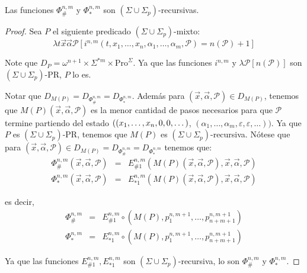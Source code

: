   \begin{theorem}
    \PN Las funciones $\Phi_{\#}^{n,m}$ y $\Phi_{\ast}^{n,m}$ son $(\Sigma \cup \Sigma_{p})$-recursivas.
  \end{theorem}
  \begin{proof}
    \PN Sea $P$ el siguiente predicado $(\Sigma \cup \Sigma_{p})$-mixto:
    \[
      \lambda t\vec{x}\vec{\alpha}\mathcal{P}\left[i^{n,m}(t,x_{1},\dotsc,x_{n},\alpha_{1},\dotsc,\alpha_{m},
      \mathcal{P}) = n(\mathcal{P}) + 1\right]
    \]

    \PN Note que $D_{P} = \omega^{n+1} \times \Sigma^{\ast m} \times \mathrm{Pro}^{\Sigma}$. Ya que las funciones
    $i^{n,m}$ y $\lambda \mathcal{P} \left[n(\mathcal{P})\right]$ son $(\Sigma \cup \Sigma_{p})$-PR, $P$ lo es.

    \PN Notar que $D_{M(P)} = D_{\Phi_{\#}^{n,m}} = D_{\Phi_{\ast}^{n,m}}$. Además para $(\vec{x},\vec{\alpha},
    \mathcal{P}) \in D_{M(P)}$, tenemos que $M(P)(\vec{x},\vec{\alpha},\mathcal{P})$ es la menor cantidad de pasos
    necesarios para que $\mathcal{P}$ termine partiendo del estado $((x_{1},\dotsc,x_{n},0, \linebreak 0,\dotsc)$,
    $(\alpha_{1},\dotsc,\alpha_{m},\varepsilon,\varepsilon,\dotsc))$. Ya que $P$ es $(\Sigma \cup \Sigma_{p})$-PR,
    tenemos que $M(P)$ es $(\Sigma \cup \Sigma_{p})$-recursiva. Nótese que para $(\vec{x},\vec{\alpha},\mathcal{P})
    \in D_{M(P)} = D_{\Phi_{\#}^{n,m}} = D_{\Phi_{\ast}^{n,m}}$ tenemos que:
    \begin{eqnarray*}
      \Phi_{\#}^{n,m}(\vec{x},\vec{\alpha},\mathcal{P}) &=& E_{\#1}^{n,m}\left(M(P)(\vec{x},\vec{\alpha},\mathcal{P}),
        \vec{x},\vec{\alpha},\mathcal{P}\right) \\
      \Phi_{\ast}^{n,m}(\vec{x},\vec{\alpha},\mathcal{P}) &=& E_{\ast1}^{n,m}\left(M(P)(\vec{x},\vec{\alpha},
        \mathcal{P}),\vec{x},\vec{\alpha},\mathcal{P}\right)
    \end{eqnarray*}

    \PN es decir,
    \begin{eqnarray*}
      \Phi_{\#}^{n,m} &=& E_{\#1}^{n,m} \circ \left(M(P),p_{1}^{n,m+1},\dotsc,p_{n+m+1}^{n,m+1}\right) \\
      \Phi_{\ast}^{n,m} &=& E_{\ast1}^{n,m} \circ \left(M(P),p_{1}^{n,m+1},\dotsc,p_{n+m+1}^{n,m+1}\right)
    \end{eqnarray*}

    \PN Ya que las funciones $E_{\#1}^{n,m}, E_{\ast1}^{n,m}$ son $(\Sigma \cup \Sigma_{p})$-recursiva, lo son
    $\Phi_{\#}^{n,m}$ y $\Phi_{\ast}^{n,m}$.
  \end{proof}

